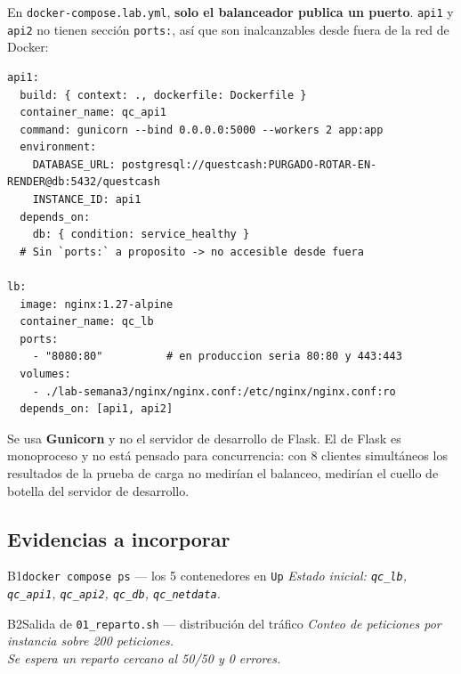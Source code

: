 \documentclass[11pt,letterpaper]{article}
\begin{document}
En \texttt{docker-compose.lab.yml}, \textbf{solo el balanceador publica un
puerto}. \texttt{api1} y \texttt{api2} no tienen sección \texttt{ports:}, así
que son inalcanzables desde fuera de la red de Docker:

\begin{lstlisting}[style=conf,language=yamlqc,caption={\texttt{docker-compose.lab.yml} — extracto de las instancias y el proxy.}]
api1:
  build: { context: ., dockerfile: Dockerfile }
  container_name: qc_api1
  command: gunicorn --bind 0.0.0.0:5000 --workers 2 app:app
  environment:
    DATABASE_URL: postgresql://questcash:PURGADO-ROTAR-EN-RENDER@db:5432/questcash
    INSTANCE_ID: api1
  depends_on:
    db: { condition: service_healthy }
  # Sin `ports:` a proposito -> no accesible desde fuera

lb:
  image: nginx:1.27-alpine
  container_name: qc_lb
  ports:
    - "8080:80"          # en produccion seria 80:80 y 443:443
  volumes:
    - ./lab-semana3/nginx/nginx.conf:/etc/nginx/nginx.conf:ro
  depends_on: [api1, api2]
\end{lstlisting}

\begin{nota}
Se usa \textbf{Gunicorn} y no el servidor de desarrollo de Flask. El de Flask es
monoproceso y no está pensado para concurrencia: con 8 clientes simultáneos los
resultados de la prueba de carga no medirían el balanceo, medirían el cuello de
botella del servidor de desarrollo.
\end{nota}

\subsection{Evidencias a incorporar}

\begin{captura}{B1}{\texttt{docker compose ps} — los 5 contenedores en \texttt{Up}}
\vspace{2.0cm}
\centering\itshape\color{qcGray}\footnotesize
Estado inicial: \texttt{qc\_lb}, \texttt{qc\_api1}, \texttt{qc\_api2},
\texttt{qc\_db}, \texttt{qc\_netdata}.
\vspace{1.8cm}
\end{captura}

\vspace{0.6em}
\begin{captura}{B2}{Salida de \texttt{01\_reparto.sh} — distribución del tráfico}
\vspace{2.2cm}
\centering\itshape\color{qcGray}\footnotesize
Conteo de peticiones por instancia sobre 200 peticiones.\\
Se espera un reparto cercano al 50/50 y 0 errores.
\vspace{2.0cm}
\end{captura}
\end{document}
